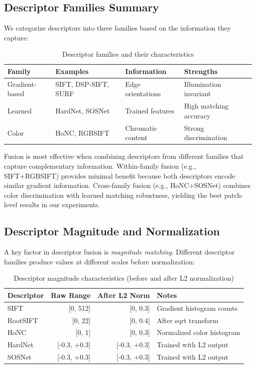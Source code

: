 \subsection{Descriptor Families Summary}

We categorize descriptors into three families based on the information they capture:

\begin{table}[h]
\centering
\caption{Descriptor families and their characteristics}
\label{tab:descriptor_families}
\begin{tabular}{llll}
\toprule
\textbf{Family} & \textbf{Examples} & \textbf{Information} & \textbf{Strengths} \\
\midrule
Gradient-based & SIFT, DSP-SIFT, SURF & Edge orientations & Illumination invariant \\
Learned & HardNet, SOSNet & Trained features & High matching accuracy \\
Color & HoNC, RGBSIFT & Chromatic content & Strong discrimination \\
\bottomrule
\end{tabular}
\end{table}

Fusion is most effective when combining descriptors from different families that capture complementary information. Within-family fusion (e.g., SIFT+RGBSIFT) provides minimal benefit because both descriptors encode similar gradient information. Cross-family fusion (e.g., HoNC+SOSNet) combines color discrimination with learned matching robustness, yielding the best patch-level results in our experiments.

\subsection{Descriptor Magnitude and Normalization}

A key factor in descriptor fusion is \textit{magnitude matching}. Different descriptor families produce values at different scales before normalization:

\begin{table}[h]
\centering
\caption{Descriptor magnitude characteristics (before and after L2 normalization)}
\label{tab:magnitudes}
\begin{tabular}{lrrl}
\toprule
\textbf{Descriptor} & \textbf{Raw Range} & \textbf{After L2 Norm} & \textbf{Notes} \\
\midrule
SIFT & [0, 512] & [0, 0.3] & Gradient histogram counts \\
RootSIFT & [0, 22] & [0, 0.4] & After sqrt transform \\
HoNC~\cite{olson2016keypoint} & [0, 1] & [0, 0.3] & Normalized color histogram \\
HardNet & [-0.3, +0.3] & [-0.3, +0.3] & Trained with L2 output \\
SOSNet & [-0.3, +0.3] & [-0.3, +0.3] & Trained with L2 output \\
\bottomrule
\end{tabular}
\end{table}

